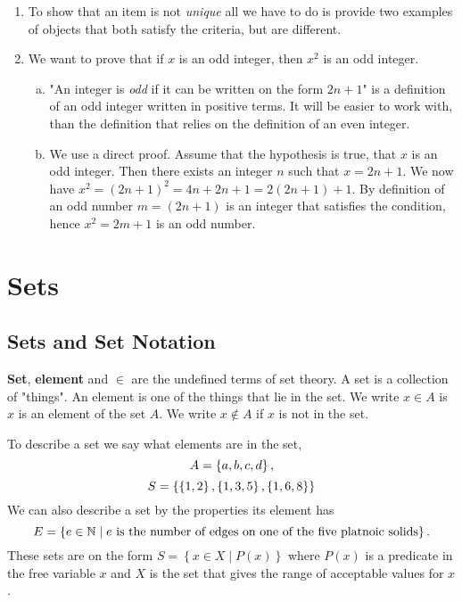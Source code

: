 \documentclass[a4paper, 11pt]{report}
\theoremstyle{plain}
\theoremstyle{definition}
\begin{document}
\begin{enumerate}
  \item To show that an item is not \textit{unique} all we have to do is
    provide two examples of objects that both satisfy the criteria, but are
    different.
 
  \item 
    We want to prove that if $x$ is an odd integer, then $x^2$ is an odd integer.
    \begin{enumerate}[a)]
      \item "An integer is \textit{odd} if it can be written on the form $2n +
        1$" is a definition of an odd integer written in positive terms. It
        will be easier to work with, than the definition that relies on the
        definition of an even integer.

      \item We use a direct proof. Assume that the hypothesis is true, that $x$
        is an odd integer. Then there exists an integer $n$ such that $x = 2n +
        1$.  We now have $x^2 = (2n + 1)^2 = 4n + 2n + 1 = 2(2n + 1) + 1$. By
        definition of an odd number $m = (2n + 1)$ is an integer that satisfies
        the condition, hence $x^2 = 2m + 1$ is an odd number.
    \end{enumerate}
  
\end{enumerate}
\chapter{Sets}
\label{cha:sets}

\section{Sets and Set Notation}
\label{sec:sets_and_set_notation}

\textbf{Set}, \textbf{element} and $\in$\index{$\in$}
are the undefined terms of set theory.  A set is a collection of "things". An
element is one of the things that lie in the set.  We write $x \in A$ is $x$ is
an element of the set $A$. We write $x \notin A$ if $x$ is not in the set.

To describe a set we say what elements are in the set,
\begin{equation}
  \notag
  A  = \left\{ a, b, c, d \right\}, 
\end{equation}
\begin{equation}
  \notag
  S = \left\{ \left\{ 1, 2 \right\}, \left\{ 1, 3, 5 \right\}, \left\{ 1, 6, 8
  \right\} \right\}   
\end{equation}
We can also describe a set by the properties its element has
\begin{equation}
  \notag
  E = \left\{ e \in \mathbb{N} \mid e \text{ is the number of edges on one of
  the five platnoic solids} \right\}.
\end{equation}
These sets are on the form $S = \left\{ x \in X \mid P(x) \right\}$ where
$P(x)$ is a predicate in the free variable $x$ and $X$ is the set that gives
the range of acceptable values for $x$.
\end{document}
